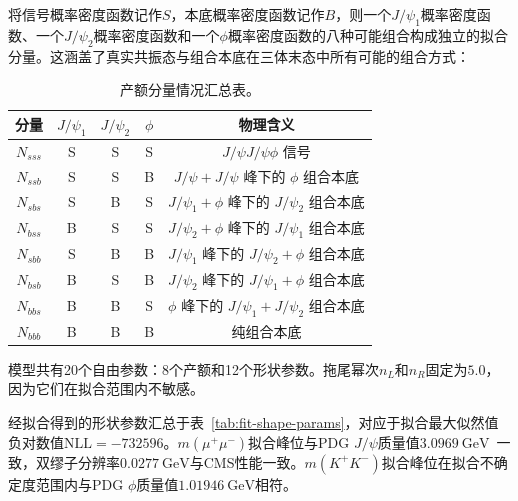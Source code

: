 将信号概率密度函数记作$S$，本底概率密度函数记作$B$，则一个$J/\psi_1$概率密度函数、一个$J/\psi_2$概率密度函数和一个$\phi$概率密度函数的八种可能组合构成独立的拟合分量。这涵盖了真实共振态与组合本底在三体末态中所有可能的组合方式：

\begin{table}[htbp]
  \centering
  \caption{产额分量情况汇总表。}
  \label{tab:yield-components}
  \small
  \begin{tabular}{ccccc}
    \toprule
    分量 & $J/\psi_1$ & $J/\psi_2$ & $\phi$ & 物理含义 \\
    \midrule
    $N_{sss}$ & S & S & S & $J/\psi J/\psi \phi$ 信号 \\
    $N_{ssb}$ & S & S & B & $J/\psi + J/\psi$ 峰下的 $\phi$ 组合本底 \\
    $N_{sbs}$ & S & B & S & $J/\psi_1 + \phi$ 峰下的 $J/\psi_2$ 组合本底 \\
    $N_{bss}$ & B & S & S & $J/\psi_2 + \phi$ 峰下的 $J/\psi_1$ 组合本底 \\
    $N_{sbb}$ & S & B & B & $J/\psi_1$ 峰下的 $J/\psi_2 + \phi$ 组合本底 \\
    $N_{bsb}$ & B & S & B & $J/\psi_2$ 峰下的 $J/\psi_1 + \phi$ 组合本底 \\
    $N_{bbs}$ & B & B & S & $\phi$ 峰下的 $J/\psi_1 + J/\psi_2$ 组合本底 \\
    $N_{bbb}$ & B & B & B & 纯组合本底 \\
    \bottomrule
  \end{tabular}
\end{table}

模型共有20个自由参数：8个产额和12个形状参数。拖尾幂次$n_L$和$n_R$固定为$5.0$，因为它们在拟合范围内不敏感。

经拟合得到的形状参数汇总于表~\ref{tab:fit-shape-params}，对应于拟合最大似然值负对数值$\mathrm{NLL} = -732596$。$m(\mu^+\mu^-)$拟合峰位与PDG $J/\psi$质量值$\SI{3.0969}{\giga\eV}$~\cite{PDG2024}一致，双缪子分辨率$\SI{0.0277}{\giga\eV}$与CMS性能一致。$m(K^+K^-)$拟合峰位在拟合不确定度范围内与PDG $\phi$质量值$\SI{1.01946}{\giga\eV}$相符。

